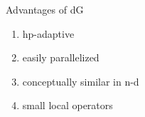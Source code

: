 {\begin{columns}
\begin{column}{.48\textwidth}
\vspace{-.2cm}
      \begin{block}{\centering Advantages of dG}
        \begin{enumerate}
        \item[\blacksquare]hp-adaptive
        \item[\blacksquare]easily parallelized
        \item[\blacksquare]conceptually similar in n-d
        \item[\blacksquare]small local operators
        \end{enumerate}
      \end{block}
    \end{column}
  \end{columns}

}

